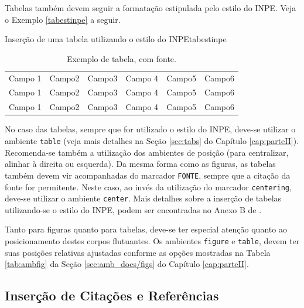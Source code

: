 Tabelas também devem seguir a formatação estipulada pelo estilo do INPE. Veja o Exemplo \ref{tabestinpe} a seguir.

\begin{texexptitled}[breakable,center lower,enhanced,middle=2mm,listing and text]{Inserção de uma tabela utilizando o estilo do INPE}{tabestinpe}
\begin{table}[H] %
\begin{center} %
\caption{Exemplo de tabela, com fonte.}
\begin{tabular}{l|l|c|c|r|r}
\hline %
Campo 1 & Campo2 & Campo3 & Campo 4 & Campo5 & Campo6 \\
Campo 1 & Campo2 & Campo3 & Campo 4 & Campo5 & Campo6 \\
Campo 1 & Campo2 & Campo3 & Campo 4 & Campo5 & Campo6 \\				
\hline %
\end{tabular}
\end{center}
\end{table}
\end{texexptitled}

No caso das tabelas, sempre que for utilizado o estilo do INPE, deve-se utilizar o ambiente {\tt table} (veja mais detalhes na Seção \ref{sec:tabs} do Capítulo \ref{cap:parteII}). Recomenda-se também a utilização dos ambientes de posição (para centralizar, alinhar à direita ou esquerda). Da mesma forma como as figuras, as tabelas também devem vir acompanhadas do marcador {\tt FONTE}, sempre que a citação da fonte for permitente. Neste caso, ao invés da utilização do marcador {\tt centering}, deve-se utilizar o ambiente {\tt center}. Mais detalhes sobre a inserção de tabelas utilizando-se o estilo do INPE, podem ser encontradas no Anexo B de .

Tanto para figuras quanto para tabelas, deve-se ter especial atenção quanto ao posicionamento destes corpos flutuantes. Os ambientes {\tt figure} e {\tt table}, devem ter suas posições relativas ajustadas conforme as opções mostradas na Tabela \ref{tab:ambfig} da Seção \ref{sec:amb_docs/figs} do Capítulo \ref{cap:parteII}.

\subsection{Inserção de Citações e Referências}
\label{sec:citerefs}

